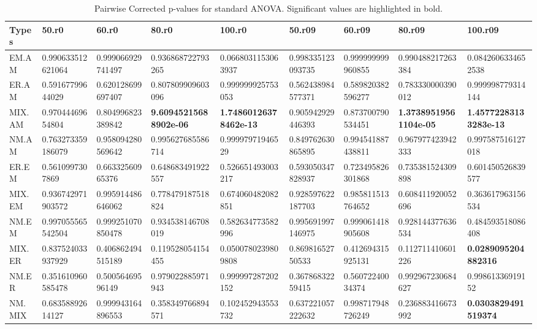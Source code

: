 \documentclass[]{article}
\begin{document}
\begin{table}[H]

\caption{\label{tab:unnamed-chunk-43}Pairwise Corrected p-values for standard ANOVA. Significant values are highlighted in bold.}
\centering
\begin{tabular}{l|l|l|l|l|l|l|l|l}
\hline
Types & 50.r0 & 60.r0 & 80.r0 & 100.r0 & 50.r09 & 60.r09 & 80.r09 & 100.r09\\
\hline
EM.AM & 0.990633512621064 & 0.999066929741497 & 0.936868722793265 & 0.0668031153063937 & 0.998335123093735 & 0.999999999960855 & 0.990488217263384 & 0.0842606334652538\\
\hline
ER.AM & 0.59167799644029 & 0.620128699697407 & 0.807809909603096 & 0.999999925753053 & 0.562438984577371 & 0.589820382596277 & 0.783330000390012 & 0.999998779314144\\
\hline
MIX.AM & 0.97044469654804 & 0.804996823389842 & \textbf{9.60945215688902e-06} & \textbf{1.74860126378462e-13} & 0.905942929446393 & 0.873700790534451 & \textbf{1.37389519561104e-05} & \textbf{1.45772283133283e-13}\\
\hline
NM.AM & 0.763273359186079 & 0.958094280569642 & 0.995627685586714 & 0.99997971946529 & 0.849762630865895 & 0.994541887438811 & 0.967977423942333 & 0.997587516127018\\
\hline
ER.EM & 0.5610997307869 & 0.66332560965376 & 0.648683491922557 & 0.526651493003217 & 0.593050347828937 & 0.723495826301868 & 0.735381524309898 & 0.601450526839577\\
\hline
MIX.EM & 0.936742971903572 & 0.995914486646062 & 0.778479187518824 & 0.674060482082851 & 0.928597622187703 & 0.985811513764652 & 0.608411920052696 & 0.363617963156534\\
\hline
NM.EM & 0.997055565542504 & 0.999251070850478 & 0.934538146708019 & 0.582634773582996 & 0.995691997146975 & 0.999061418905608 & 0.928144377636534 & 0.484593518086408\\
\hline
MIX.ER & 0.837524033937929 & 0.406862494515189 & 0.119528054154455 & 0.0500780239809808 & 0.86981652750533 & 0.412694315925131 & 0.112711410601226 & \textbf{0.0289095204882316}\\
\hline
NM.ER & 0.351610960585478 & 0.50056469596149 & 0.979022885971943 & 0.999997287202152 & 0.36786832259415 & 0.56072240034374 & 0.992967230684627 & 0.99861336919152\\
\hline
NM.MIX & 0.68358892614127 & 0.999943164896553 & 0.358349766894571 & 0.102452943553732 & 0.637221057222632 & 0.998717948726249 & 0.236883416673992 & \textbf{0.0303829491519374}\\
\hline
\end{tabular}
\end{table}
\end{document}
